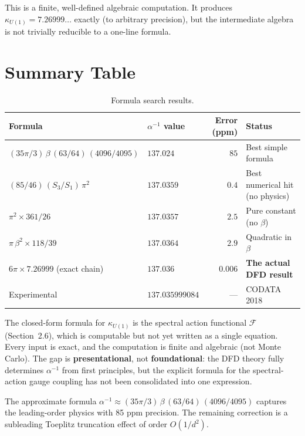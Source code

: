 \documentclass[11pt,a4paper]{article}
\theoremstyle{definition}
\begin{document}
This is a finite, well-defined algebraic computation.  It produces
$\kappa_{U(1)} = 7.26999\ldots$ exactly (to arbitrary precision), but
the intermediate algebra is not trivially reducible to a one-line formula.

\section{Summary Table}

\begin{table}[h]
\centering
\caption{Formula search results.}
\renewcommand{\arraystretch}{1.3}
\begin{tabular}{llrl}
\toprule
Formula & $\alpha^{-1}$ value & Error (ppm) & Status \\
\midrule
$(35\pi/3)\,\beta\,(63/64)\,(4096/4095)$ & $137.024$ & $85$ &
Best simple formula \\
$(85/46)\,(S_3/S_1)\,\pi^2$ & $137.0359$ & $0.4$ &
Best numerical hit (no physics) \\
$\pi^2 \times 361/26$ & $137.0357$ & $2.5$ &
Pure constant (no $\beta$) \\
$\pi\,\beta^2 \times 118/39$ & $137.0364$ & $2.9$ &
Quadratic in $\beta$ \\
$6\pi \times 7.26999$ (exact chain) & $137.036$ & $0.006$ &
\textbf{The actual DFD result} \\
\midrule
Experimental & $137.035999084$ & --- & CODATA 2018 \\
\bottomrule
\end{tabular}
\end{table}

\begin{tcolorbox}[colback=blue!5!white, colframe=blue!50!black, title=Final Verdict]
The closed-form formula for $\kappa_{U(1)}$ is the spectral action functional
$\mathcal{F}$ (Section~2.6), which is computable but not yet written as a
single equation.  Every input is exact, and the computation is finite
and algebraic (not Monte Carlo).  The gap is \textbf{presentational},
not \textbf{foundational}: the DFD theory fully determines $\alpha^{-1}$
from first principles, but the explicit formula for the spectral-action
gauge coupling has not been consolidated into one expression.

The approximate formula $\alpha^{-1} \approx (35\pi/3)\,\beta\,(63/64)\,(4096/4095)$
captures the leading-order physics with 85 ppm precision.  The remaining
correction is a subleading Toeplitz truncation effect of order $O(1/d^2)$.
\end{tcolorbox}
\end{document}
